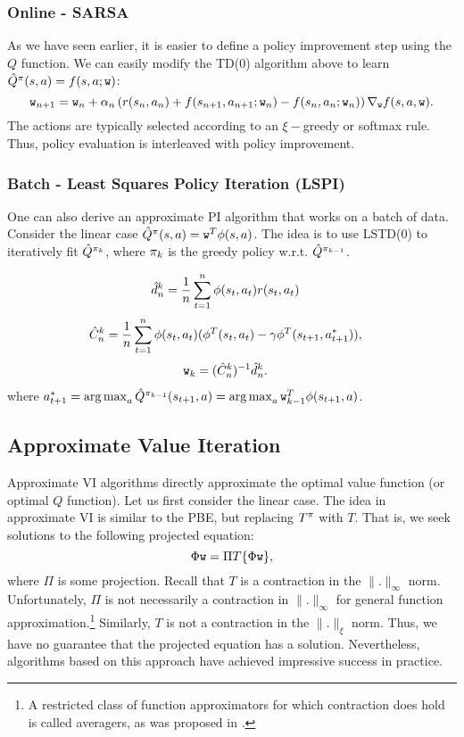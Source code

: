 \subsubsection{Online - SARSA}
As we have seen earlier, it is easier to define a policy improvement step using the $Q$ function. We can easily modify the TD(0) algorithm above to learn $\hat{Q}^\pi(s,a) = f(s,a;\texttt{w})$:
\begin{equation*}
    \texttt{w}_{n+1} = \texttt{w}_n + \alpha_n \left( r(s_n,a_n) + f(s_{n+1},a_{n+1};\texttt{w}_n) - f(s_{n},a_{n}; \texttt{w}_n) \right) \nabla_{\texttt{w}} f(s,a,\texttt{w}).
\end{equation*}
The actions are typically selected according to an $\xi-$greedy or softmax rule. Thus, policy evaluation is interleaved with policy improvement.

\subsubsection{Batch - Least Squares Policy Iteration (LSPI)}
One can also derive an approximate PI algorithm that works on a batch of data. Consider the linear case $\hat{Q}^\pi(s,a) = \texttt{w}^T \phi(s,a)$. The idea is to use LSTD(0) to iteratively fit $\hat{Q}^{\pi_k}$, where $\pi_k$ is the greedy policy w.r.t. $\hat{Q}^{\pi_{k-1}}$.

\begin{align*}
\hat{d}_n^k &= \frac{1}{n} \sum_{t=1}^n  {\phi}(s_t, a_t) r(s_t,a_t) 
\end{align*}
\begin{align*}
\hat{C}_n^k &= \frac{1}{n} \sum_{t=1}^n {\phi}(s_t,a_t)( {\phi}^T(s_t,a_t)-\gamma {\phi}^T(s_{t+1},a^*_{t+1})),
\end{align*}
\begin{align*}
\texttt{w}_k &= (\hat{C}_n^k)^{-1} \hat{d}_n^k.
\end{align*}
where $a^*_{t+1} = \argmax_a \hat{Q}^{\policy_{k-1}}(s_{t+1},a) = \argmax_a \weights_{k-1}^T\ftrs(s_{t+1},a)$.

\subsection{Approximate Value Iteration}
Approximate VI algorithms directly approximate the optimal value function (or optimal $Q$ function). Let us first consider the linear case. The idea in approximate VI is similar to the PBE, but replacing $T^\pi$ with $T$. That is, we seek solutions to the following projected equation:
\begin{equation*}
    \Phi \texttt{w} = \Pi T \{\Phi \texttt{w}\},
\end{equation*}
where $\Pi$ is some projection. Recall that $T$ is a contraction in the $\|.\|_\infty$ norm. Unfortunately, $\Pi$ is not necessarily a contraction in $\|.\|_\infty$ for general function approximation.\footnote{A restricted class of function approximators for which contraction does hold is called averagers, as was proposed in \cite{gordon1995stable}.} Similarly, $T$ is not a contraction in the $\|.\|_\xi$ norm. Thus, we have no guarantee that the projected equation has a solution. Nevertheless, algorithms based on this approach have achieved impressive success in practice. 

